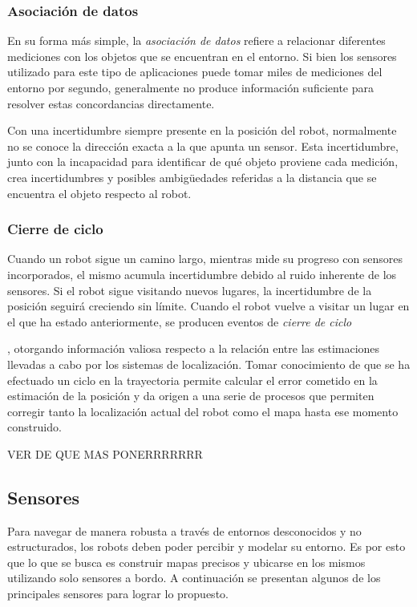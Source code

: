 \subsubsection{Asociación de datos}
En su forma más simple, la \textit{asociación de datos} refiere a relacionar diferentes mediciones con los objetos que se encuentran en el entorno. Si bien los sensores utilizado para este tipo de aplicaciones puede tomar miles de mediciones del entorno por segundo, generalmente no produce información suficiente para resolver estas concordancias directamente.

Con una incertidumbre siempre presente en la posición del robot, normalmente no se conoce la dirección exacta a la que apunta un sensor. Esta incertidumbre, junto con la incapacidad para identificar de qué objeto proviene cada medición, crea incertidumbres y posibles ambigüedades referidas a la distancia que se encuentra el objeto respecto al robot.

\subsubsection{Cierre de ciclo}
Cuando un robot sigue un camino largo, mientras mide su progreso con sensores incorporados, el mismo acumula incertidumbre debido al ruido inherente de los sensores. Si el robot sigue visitando nuevos lugares, la incertidumbre de la posición seguirá creciendo sin límite. Cuando el robot vuelve a visitar un lugar en el que ha estado anteriormente, se producen eventos de \textit{cierre de ciclo}
\begin{large}
\end{large}, otorgando información valiosa respecto a la relación entre las estimaciones llevadas a cabo por los sistemas de localización. Tomar conocimiento de que se ha efectuado un ciclo en la trayectoria permite calcular el error cometido en la estimación de la posición y da origen a una serie de procesos que permiten corregir tanto la localización actual del robot como el mapa hasta ese momento construido.

\begin{large}
VER DE QUE MAS PONERRRRRRR
\end{large}{}

\subsection{Sensores}
Para navegar de manera robusta a través de entornos desconocidos y no estructurados, los robots deben poder percibir y modelar su entorno. Es por esto que lo que se busca es construir mapas precisos y ubicarse en los mismos utilizando solo sensores a bordo. A continuación se presentan algunos de los principales sensores para lograr lo propuesto.

